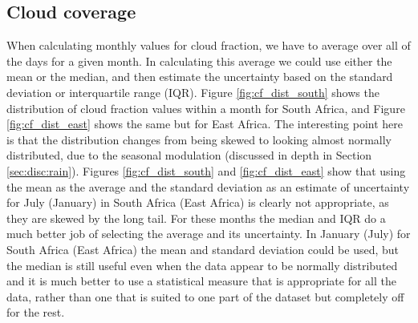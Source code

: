 \subsection{Cloud coverage}
\label{sec:disc:cc}
When calculating monthly values for cloud fraction, we have to average
over all of the days for a given month. In calculating this average we
could use either the mean or the median, and then estimate the
uncertainty based on the standard deviation or interquartile range
(IQR). Figure \ref{fig:cf_dist_south} shows the distribution of cloud
fraction values within a month for South Africa, and Figure
\ref{fig:cf_dist_east} shows the same but for East Africa. The
interesting point here is that the distribution changes from being
skewed to looking almost normally distributed, due to the seasonal
modulation (discussed in depth in Section
\ref{sec:disc:rain}). Figures \ref{fig:cf_dist_south} and
\ref{fig:cf_dist_east} show that using the mean as the average and the
standard deviation as an estimate of uncertainty for July (January) in
South Africa (East Africa) is clearly not appropriate, as they are
skewed by the long tail. For these months the median and IQR do a much
better job of selecting the average and its uncertainty. In January
(July) for South Africa (East Africa) the mean and standard deviation
could be used, but the median is still useful even when the data
appear to be normally distributed and it is much better to use a
statistical measure that is appropriate for all the data, rather than
one that is suited to one part of the dataset but completely off for
the rest.
